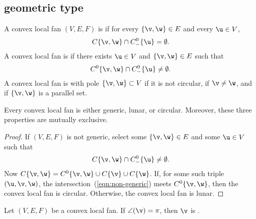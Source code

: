\subsection{geometric type}\label{sec:types}

\begin{definition}
A convex local fan $(V,E,F)$ is   if for every $\{\v,\w\}\in E$
and every $\u\in V$, 
\begin{displaymath}
C\{\v,\w\}\cap C^0_-\{\u\} = \emptyset.
\end{displaymath}
A convex local fan is   if there exists $\u\in V$ and
$\{\v,\w\}\in E$ such that
\begin{displaymath}
C^0\{\v,\w\}\cap C^0_-\{\u\}\ne \emptyset.
\end{displaymath}
A convex local fan is  with pole $\{\v,\w\} \subset V$ if it is not
circular, if $\v\ne\w$, and if $\{\v,\w\}$ is a parallel set.
\end{definition}
%
%
%


\begin{lemma}[trichotomy] Every convex local fan is either
generic, lunar, or circular.  Moreover, these three properties are
mutually exclusive.
\end{lemma}
%
%
%
%
%

\begin{proof} If $(V,E,F)$ is not generic,  select some $\{\v,\w\}\in E$
and some $\u\in V$ such that
\begin{equation}\label{eqn:non-generic}
C\{\v,\w\}\cap C^0_-\{\u\} \ne \emptyset.
\end{equation}
Now $C\{\v,\w\} = C^0\{\v,\w\} \cup C\{\v\}\cup C\{\w\}$.  If, for
some such triple $(\u,\v,\w)$, the
intersection~(\ref{eqn:non-generic}) meets $C^0\{\v,\w\}$, then the
convex local fan is circular.  Otherwise, the convex local fan is lunar.
\end{proof}

\begin{definition}[flat]
 Let $(V,E,F)$ be a convex local fan.
If $\angle(\v)=\pi$, then $\v$ is .
\end{definition}


